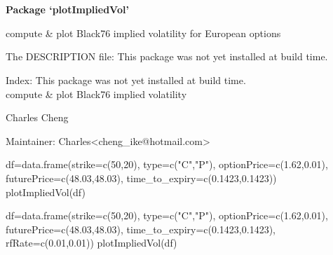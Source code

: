 \documentclass[a4paper]{book}
\begin{document}
\chapter*{}
\begin{center}
{\textbf{\huge Package `plotImpliedVol'}}
\par\bigskip{\large \today}
\end{center}
\begin{description}
\raggedright{}
\item[Type]
\item[Title]
\item[Version]
\item[Date]
\item[Author]
\item[Maintainer]\AsIs{}
\item[Description]
\item[License]
\end{description}
%
\begin{Description}\relax
compute \& plot Black76 implied volatility for European options
\end{Description}
%
\begin{Details}\relax

The DESCRIPTION file:
This package was not yet installed at build time.\\{}

Index:  This package was not yet installed at build time.\\{}
compute \& plot Black76 implied volatility
\end{Details}
%
\begin{Author}\relax
Charles Cheng

Maintainer: Charles<cheng\_ike@hotmail.com>
\end{Author}
%
\begin{Examples}
\begin{ExampleCode}
df=data.frame(strike=c(50,20), type=c("C","P"), optionPrice=c(1.62,0.01), futurePrice=c(48.03,48.03), time_to_expiry=c(0.1423,0.1423))
plotImpliedVol(df)

df=data.frame(strike=c(50,20), type=c("C","P"), optionPrice=c(1.62,0.01), futurePrice=c(48.03,48.03), time_to_expiry=c(0.1423,0.1423), rfRate=c(0.01,0.01))
plotImpliedVol(df)
\end{ExampleCode}
\end{Examples}
\end{document}
